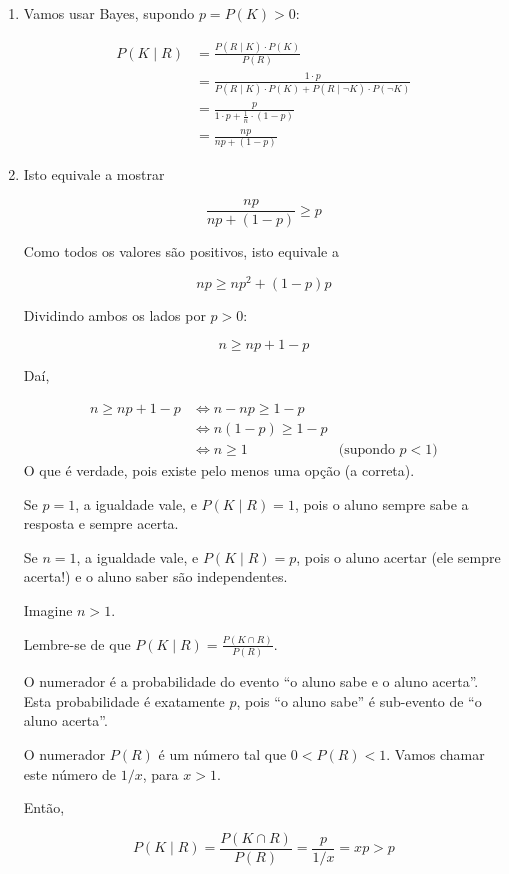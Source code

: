 \documentclass[
  11pt]{report}
\begin{document}
\begin{enumerate}
\def\labelenumi{\alph{enumi}.}
\item
  Vamos usar Bayes, supondo $p = P(K) > 0$:

  \[
  \begin{aligned}
  P(K \mid R)
  &=
  \frac{P(R \mid K) \cdot P(K)}{P(R)} \\
  &=
  \frac{1 \cdot p}{
    P(R \mid K) \cdot P(K) + 
    P(R \mid \neg K) \cdot P(\neg K)
  } \\
  &=
  \frac{p}{
    1 \cdot p + 
    \frac{1}{n} \cdot (1 - p)
  } \\
  &=
  \frac{np}{np + (1 - p)}
  \end{aligned}
  \]
\item
  Isto equivale a mostrar

  \[
  \frac{np}{np + (1 - p)} \geq p
  \]

  Como todos os valores são positivos, isto equivale a

  \[
  np \geq np^2 + (1 - p)p
  \]

  Dividindo ambos os lados por $p > 0$:

  \[
  n \geq np + 1 - p
  \]

  Daí,

  \[
  \begin{aligned}
  n \geq np + 1 - p 
  &\iff n - np \geq 1 - p \\
  &\iff n(1 - p) \geq 1 - p \\
  &\iff n \geq 1 & \text{(supondo } p < 1 \text{)}
  \end{aligned}
  \]
  O que é verdade, pois existe pelo menos uma opção (a correta).

  Se $p = 1$, a igualdade vale, e $P(K \mid R) = 1$, pois o aluno sempre sabe a resposta e sempre acerta.

  Se $n = 1$, a igualdade vale, e $P(K \mid R) = p$, pois o aluno acertar (ele sempre acerta!) e o aluno saber são independentes.

  Imagine $n > 1$.

  Lembre-se de que $P(K \mid R) = \frac{P(K \cap R)}{P(R)}$.

  O numerador é a probabilidade do evento ``o aluno sabe e o aluno acerta''. Esta probabilidade é exatamente $p$, pois ``o aluno sabe'' é sub-evento de ``o aluno acerta''.

  O numerador $P(R)$ é um número tal que $0 < P(R) < 1$. Vamos chamar este número de $1/x$, para $x > 1$.

  Então,

  \[
  P(K \mid R) = \frac{P(K \cap R)}{P(R)} = \frac{p}{1/x} = xp > p
  \]
\end{enumerate}
\end{document}
